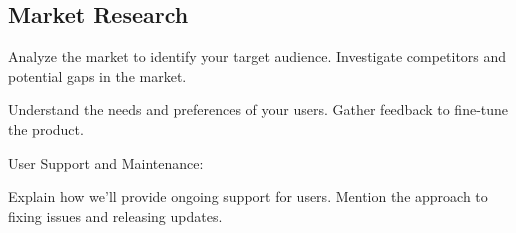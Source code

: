 
\subsection{Market Research}

Analyze the market to identify your target audience.
Investigate competitors and potential gaps in the market.

Understand the needs and preferences of your users.
Gather feedback to fine-tune the product.

User Support and Maintenance:

    Explain how we'll provide ongoing support for users.
    Mention the approach to fixing issues and releasing updates.